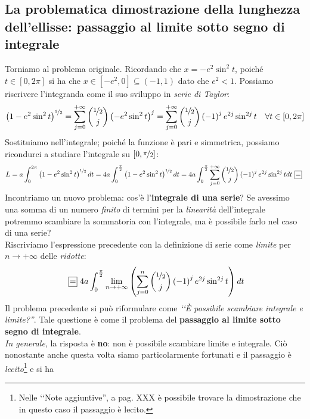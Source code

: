 \subsection{La problematica dimostrazione della lunghezza dell'ellisse: passaggio al limite sotto segno di integrale}
Torniamo al problema originale. Ricordando che $x=-e^2\sin^2 t$, poiché $t\in\left[0,2\pi\right]$ si ha che $x\in\left[-e^2, 0\right]\subseteq\left(-1, 1\right)$ dato che $e^2<1$. Possiamo riscrivere l'integranda come il suo sviluppo in \textit{serie di Taylor}:
\begin{align*}
	\left(1-e^2\sin^2t\right)^{\nicefrac{1}{2}}=\sum_{j=0}^{+\infty}\binom{\nicefrac{1}{2}}{j}\left(-e^2\sin^2t\right)^j=\sum_{j=0}^{+\infty}\binom{\nicefrac{1}{2}}{j}\left(-1\right)^je^{2j}\sin^{2j}t\quad \forall t\in\left[0, 2\pi\right]
\end{align*}
Sostituiamo nell'integrale; poiché la funzione è pari e simmetrica, possiamo ricondurci a studiare l'integrale su $\left[0,\nicefrac{\pi}{2}\right]$:
\begin{equation*}
L=a\int_{0}^{2\pi}\left(1-e^2\sin^2t\right)^{\nicefrac{1}{2}}dt=4a\int_{0}^{\frac{\pi}{2}}\left(1-e^2\sin^2t\right)^{\nicefrac{1}{2}}dt=4a\int_{0}^{\frac{\pi}{2}}\sum_{j=0}^{+\infty}\binom{\nicefrac{1}{2}}{j}\left(-1\right)^je^{2j}\sin^{2j}tdt\squarequal
\end{equation*}
Incontriamo un nuovo problema: cos'è l'\textbf{integrale di una serie}? Se avessimo una somma di un numero \textit{finito} di termini per la \textit{linearità} dell'integrale potremmo scambiare la sommatoria con l'integrale, ma è possibile farlo nel caso di una serie?\\
Riscriviamo l'espressione precedente con la definizione di serie come \textit{limite} per $n\to +\infty$ delle \textit{ridotte}:
\begin{equation*}
	\squarequal 4a\int_{0}^{\frac{\pi}{2}}\lim_{n\to+\infty}\left(\sum_{j=0}^{n}\binom{\nicefrac{1}{2}}{j}\left(-1\right)^je^{2j}\sin^{2j}t\right)dt
\end{equation*}
Il problema precedente si può riformulare come \emph{‘‘È possibile scambiare integrale e limite?''}. Tale questione è come il problema del \textbf{passaggio al limite sotto segno di integrale}.\\
\textit{In generale}, la risposta è \textbf{no}: non è possibile scambiare limite e integrale. Ciò nonostante anche questa volta siamo particolarmente fortunati e il passaggio è \textit{lecito}\footnote{Nelle ‘‘Note aggiuntive'', a pag. XXX è possibile trovare la dimostrazione che in questo caso il passaggio è lecito.} e si ha
